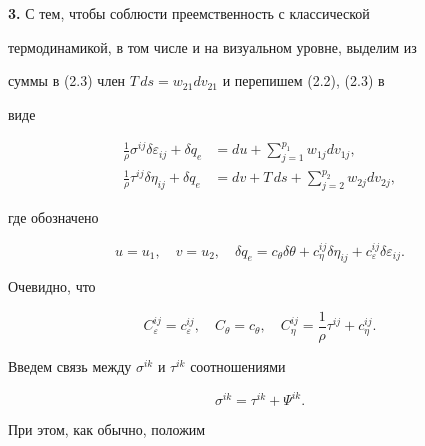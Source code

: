 {\bf 3.} С тем, чтобы соблюсти преемственность с классической


термодинамикой, в том числе и на визуальном уровне, выделим из


суммы в (2.3) член $T\,ds=w_{21}dv_{21}$ и перепишем (2.2), (2.3) в


виде


\begin{align}


\frac{1}{\rho }\sigma^{ij}\delta\varepsilon_{ij}+\delta q_e&=


du+\sum^{p_1}_{j=1}w_{1j}dv_{1j},\tag{3.1}\\


\frac{1}{\rho }\tau^{ij}\delta\eta_{ij}+\delta q_e&=


dv+T\,ds+\sum^{p_2}_{j=2}w_{2j}dv_{2j},\tag{3.2}


\end{align}


где обозначено


$$


u=u_1,\quad v=u_2,\quad \delta q_e=c_\theta\delta\theta+


c^{ij}_\eta\delta\eta_{ij}+c^{ij}_\varepsilon\delta\varepsilon_{ij}.


$$


Очевидно, что


$$


C^{ij}_\varepsilon=c^{ij}_\varepsilon,\quad C_\theta=c_\theta,\quad


C^{ij}_\eta=\frac{1}{\rho }\tau^{ij}+c^{ij}_\eta.


$$


Введем связь между $\sigma^{ik}$ и $\tau^{ik}$ соотношениями


\begin{equation}


\sigma^{ik}=\tau^{ik}+\Psi^{ik}.\tag{3.3}


\end{equation}


При этом, как обычно, положим


